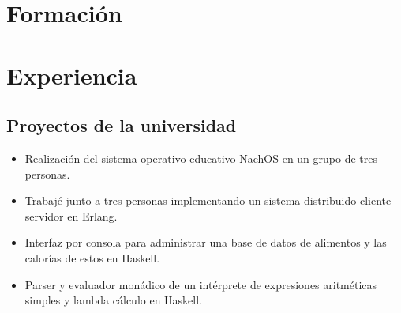\documentclass[10pt,a4paper]{moderncv}        %
\begin{document}
\makecvtitle

\section{Formación}


\section{Experiencia}
  \subsection{Proyectos de la universidad}
    \begin{itemize}
      \item Realización del sistema operativo educativo NachOS en un grupo de tres personas.
      \item Trabajé junto a tres personas implementando un sistema distribuido cliente-servidor en Erlang.
      \item Interfaz por consola para administrar una base de datos de alimentos y las calorías de estos en Haskell.
      \item Parser y evaluador monádico de un intérprete de expresiones aritméticas simples y lambda cálculo en Haskell.
    \end{itemize}
\end{document}
